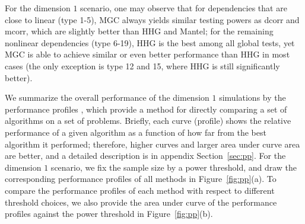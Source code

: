 \documentclass[11pt]{article}
\begin{document}
For the dimension $1$ scenario, one may observe that for dependencies that are close to linear (type 1-5), MGC always yields similar testing powers as dcorr and mcorr, which are slightly better than HHG and Mantel; for the remaining nonlinear dependencies (type 6-19), HHG is the best among all global tests, yet MGC is able to achieve similar or even better performance than HHG in most cases (the only exception is type 12 and 15, where HHG is still significantly better). 

We summarize the overall performance of the dimension $1$ simulations by the performance profiles \cite{DolanMore2002}, which provide a method for directly comparing a set of algorithms on a set of problems.  Briefly, each curve (profile) shows the relative performance of a given algorithm as a function of how far from the best algorithm it performed; therefore, higher curves and larger area under curve area are better, and a detailed description is in appendix Section~\ref{sec:pp}. For the dimension $1$ scenario, we fix the sample size by a power threshold, and draw the corresponding performance profiles of all methods in Figure~\ref{fig:pp}(a). To compare the performance profiles of each method with respect to different threshold choices, we also provide the area under curve of the performance profiles against the power threshold in Figure~\ref{fig:pp}(b).
\end{document}
